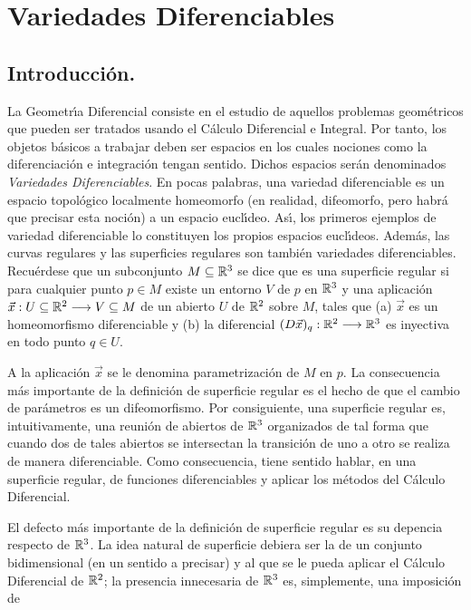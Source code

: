 \documentclass[cursovd_portada.tex]{subfiles}
\begin{document}
\chapter{Variedades Diferenciables}
\section{Introducci\'{o}n.}
\hs La Geometr\'{\i}a Diferencial consiste en el estudio de aquellos problemas geo\-m\'{e}\-tri\-cos que pueden ser
tratados usando el C\'{a}lculo Diferencial e Integral. Por tanto, los objetos b\'{a}sicos a trabajar deben ser espacios en
los cuales nociones como la diferenciaci\'{o}n e integraci\'{o}n tengan sentido. Dichos espacios ser\'{a}n denominados {\it
Variedades Diferenciables}. En pocas palabras, una variedad diferenciable es un espacio topol\'{o}gico localmente
homeomorfo (en realidad, difeomorfo, pero habr\'{a} que precisar esta noci\'{o}n) a un espacio eucl\'{\i}deo. As\'{\i}, los primeros
ejemplos de variedad diferenciable lo constituyen los propios espacios eucl\'{\i}deos. Adem\'{a}s, las curvas regulares y
las superficies regulares son tambi\'{e}n variedades diferenciables. Recu\'{e}rdese que un subconjunto $M\subseteq\mathbb{R}^3$ se
dice que es una superficie regular si para cualquier punto $p\in M$ existe un entorno $V$ de $p$ en $\mathbb{R}^3$ y una
aplicaci\'{o}n $\vec{x}:U\subseteq\mathbb{R}^2\longrightarrow V\subseteq M$ de un abierto $U$ de $\mathbb{R}^2$ sobre $M$, tales que (a) $\vec{x}$
es un homeomorfismo diferenciable y (b) la diferencial $(D\vec{x})_q:\mathbb{R}^2\longrightarrow\mathbb{R}^3$ es inyectiva en todo punto $q\in
U$.
\par
A la aplicaci\'{o}n $\vec{x}$ se le denomina parametrizaci\'{o}n de $M$ en $p$. La consecuencia m\'{a}s importante de  la
definici\'{o}n de superficie regular es el hecho de que el cambio de par\'{a}metros es un difeomorfismo. Por consiguiente,
una superficie regular es, intuitivamente, una reuni\'{o}n de abiertos de $\mathbb{R}^3$ organizados de tal forma que cuando
dos de tales abiertos se intersectan la transici\'{o}n de uno a otro se realiza de manera diferenciable. Como
consecuencia, tiene sentido hablar, en una superficie regular, de funciones diferenciables y aplicar los m\'{e}todos
del C\'{a}lculo Diferencial.
\par
El defecto m\'{a}s importante de la definici\'{o}n de superficie regular es su depencia respecto de $\mathbb{R}^3$. La idea
natural de superficie debiera ser la de un conjunto bidimensional (en un sentido a precisar) y al que se le pueda
aplicar el C\'{a}lculo Diferencial de $\mathbb{R}^2$; la presencia innecesaria de $\mathbb{R}^3$ es, simplemente, una imposici\'{o}n de
\end{document}
